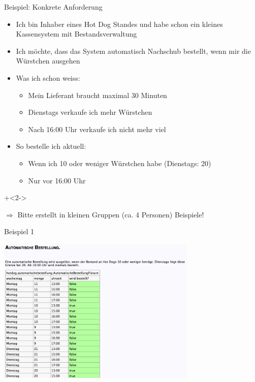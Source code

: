 \begin{frame}{Beispiel: Konkrete Anforderung}

\begin{itemize}
	\item Ich bin Inhaber eines Hot Dog Standes und habe schon ein kleines Kassensystem mit Bestandsverwaltung
	\item Ich möchte, dass das System automatisch Nachschub bestellt, wenn mir die Würstchen ausgehen
	
	\item Was ich schon weiss:
	\begin{itemize}
		\item Mein Lieferant braucht maximal 30 Minuten
		\item Dienstags verkaufe ich mehr Würstchen
		\item Nach 16:00 Uhr verkaufe ich nicht mehr viel
	\end{itemize}
	
	\item So bestelle ich aktuell:
	\begin{itemize}
		\item Wenn ich 10 oder weniger Würstchen habe (Dienstags: 20)
		\item Nur vor 16:00 Uhr
	\end{itemize}
\end{itemize}

\onslide+<2->
	
$\Rightarrow$ Bitte erstellt in kleinen Gruppen (ca. 4 Personen) Beispiele!

\end{frame}


\begin{frame}{Beispiel 1}

\begin{center}
\includegraphics[height=7cm]{SchlechtesBeispiel.png} \newline
\end{center}

\end{frame}

